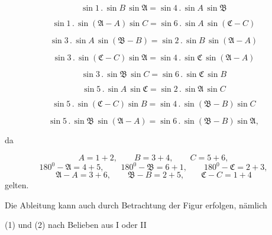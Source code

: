\begin{equation}
\sin 1 \, . \, \sin B \, \sin\mathfrak{A} = \sin 4 \, . \, \sin A \, \sin\mathfrak{B}
\tag{4}
\end{equation}

\begin{equation}
\sin 1 \, . \, \sin(\mathfrak{A}-A)\sin C = \sin 6 \, . \, \sin A \, \sin(\mathfrak{C}-C)
\tag{5}
\end{equation}

\begin{equation}
\sin 3 \, . \, \sin A \, \sin(\mathfrak{B}-B) = \sin 2 \, . \, \sin B \, \sin(\mathfrak{A}-A)
\tag{6}
\end{equation}

\begin{equation}
\sin 3 \, . \, \sin(\mathfrak{C}-C)\sin\mathfrak{A} = \sin 4 \, . \, \sin\mathfrak{C} \, \sin(\mathfrak{A}-A)
\tag{7}
\end{equation}

\begin{equation}
\sin 3 \, . \, \sin\mathfrak{B} \, \sin C = \sin 6 \, . \, \sin\mathfrak{C} \, \sin B
\tag{8}
\end{equation}

\begin{equation}
\sin 5 \, . \, \sin A \, \sin\mathfrak{C} = \sin 2 \, . \, \sin\mathfrak{A} \, \sin C
\tag{9}
\end{equation}

\begin{equation}
\sin 5 \, . \, \sin(\mathfrak{C}-C)\sin B = \sin 4 \, . \, \sin(\mathfrak{B}-B)\sin C
\tag{10}
\end{equation}

\begin{equation}
\sin 5 \, . \, \sin\mathfrak{B} \, \sin(\mathfrak{A}-A) = \sin 6 \, . \, \sin(\mathfrak{B}-B)\sin\mathfrak{A},
\tag{11}
\end{equation}

da

\[
A=1+2, \qquad B=3+4, \qquad C=5+6,
\]
\[
180^0-\mathfrak{A}=4+5, \qquad 180^0-\mathfrak{B}=6+1, \qquad 180^0-\mathfrak{C}=2+3,
\]
\[
\mathfrak{A}-A=3+6, \qquad \mathfrak{B}-B=2+5, \qquad \mathfrak{C}-C=1+4
\]
gelten.

Die Ableitung kann auch durch Betrachtung der Figur erfolgen, nämlich
\begin{center}(1) und (2) nach Belieben aus I oder II\end{center}
